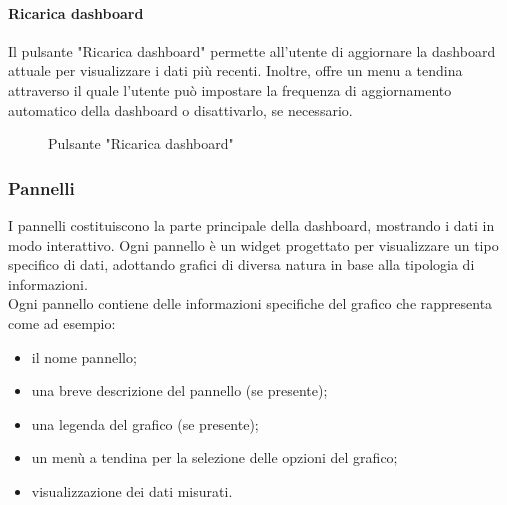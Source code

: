 \paragraph{Ricarica dashboard}
Il pulsante "Ricarica dashboard" permette all'utente di aggiornare la dashboard attuale per visualizzare i dati più recenti.  Inoltre, offre un menu a tendina attraverso il quale l'utente può impostare la frequenza di aggiornamento automatico della dashboard o disattivarlo, se necessario.
\begin{figure}[H]
    \centering
    \caption{Pulsante "Ricarica dashboard"}
    \label{fig:my_label}
\end{figure}

\subsubsection{Pannelli}
I pannelli costituiscono la parte principale della dashboard, mostrando i dati in modo interattivo. Ogni pannello è un widget progettato per visualizzare un tipo specifico di dati, adottando grafici di diversa natura in base alla tipologia di informazioni.\\
Ogni pannello contiene delle informazioni specifiche del grafico che rappresenta come ad esempio:
\begin{itemize}
    \item il nome pannello;
    \item una breve descrizione del pannello (se presente);
    \item una legenda del grafico (se presente);
    \item un menù a tendina per la selezione delle opzioni del grafico;
    \item visualizzazione dei dati misurati.
\end{itemize}

